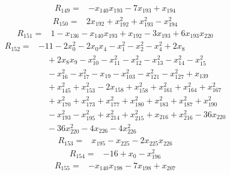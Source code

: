 \begin{equation*}\begin{split}
R_{149}={}&-x_{140} x_{193} - 7x_{193} + x_{194}
\end{split}\end{equation*}
\begin{equation*}\begin{split}
R_{150}={}&2x_{192} + x_{192}^{2} + x_{193}^{2} - x_{194}^{2}
\end{split}\end{equation*}
\begin{equation*}\begin{split}
R_{151}={}&1 - x_{136} - x_{140} x_{193} + x_{192} - 3x_{193} + 6x_{193} x_{220}
\end{split}\end{equation*}
\begin{equation*}\begin{split}
R_{152}={}&-11 - 2x_{0}^{2} - 2x_{0} x_{4} - x_{1}^{2} - x_{2}^{2} - x_{4}^{2} + 2x_{8}\\
&\quad + 2x_{8} x_{9} - x_{10}^{2} - x_{11}^{2} - x_{12}^{2} - x_{13}^{2} - x_{14}^{2} - x_{15}^{2}\\
&\quad -x_{16}^{2} - x_{17}^{2} - x_{19} - x_{103}^{2} - x_{121}^{2} - x_{127}^{2} + x_{139}\\
&\quad + x_{145}^{2} + x_{153}^{2} - 2x_{158} + x_{158}^{2} + x_{161}^{2} + x_{164}^{2} + x_{167}^{2}\\
&\quad + x_{170}^{2} + x_{173}^{2} + x_{177}^{2} + x_{180}^{2} + x_{183}^{2} + x_{187}^{2} + x_{190}^{2}\\
&\quad -x_{193}^{2} - x_{195}^{2} + x_{214}^{2} + x_{215}^{2} + x_{216} + x_{216}^{2} - 36x_{220}\\
&\quad -36x_{220}^{2} - 4x_{226} - 4x_{226}^{2}
\end{split}\end{equation*}
\begin{equation*}\begin{split}
R_{153}={}&x_{195} - x_{225} - 2x_{225} x_{226}
\end{split}\end{equation*}
\begin{equation*}\begin{split}
R_{154}={}&-16 + x_{0} - x_{196}^{2}
\end{split}\end{equation*}
\begin{equation*}\begin{split}
R_{155}={}&-x_{140} x_{198} - 7x_{198} + x_{207}
\end{split}\end{equation*}

